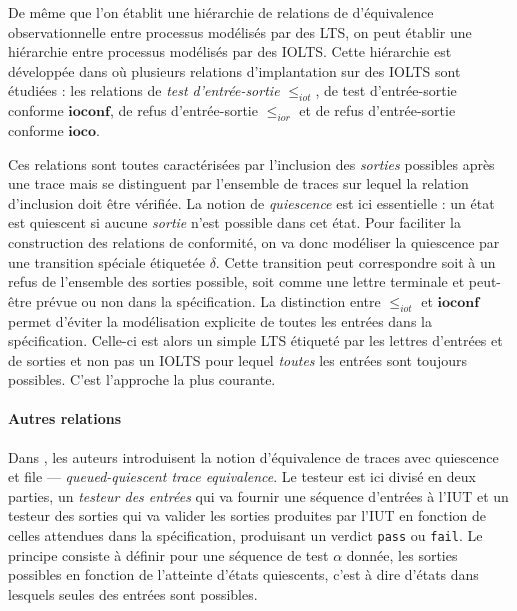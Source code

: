 De m\^eme que l'on \'etablit une hi\'erarchie de relations de
d'\'equivalence observationnelle entre processus mod\'elis\'es par
des \textsf{LTS}, on peut \'etablir une hi\'erarchie entre processus
mod\'elis\'es par des \textsf{IOLTS}. Cette hi\'erarchie est
d\'evelopp\'ee dans  \cite{tgenioq} o\`u plusieurs relations
d'implantation sur des \textsf{IOLTS} sont \'etudi\'ees :  les relations de \emph{test
  d'entr\'ee-sortie}  $\leq_{iot}$, de test d'entr\'ee-sortie
conforme $\mathbf{ioconf}$, de refus d'entr\'ee-sortie $\leq_{ior}$
et de refus d'entr\'ee-sortie conforme $\mathbf{ioco}$. 

Ces relations
sont toutes caract\'eris\'ees par l'inclusion des \emph{sorties}
possibles apr\`es une trace mais se distinguent par l'ensemble de
traces sur lequel la relation d'inclusion doit \^etre
v\'erifi\'ee. La notion de \emph{quiescence} est ici essentielle :
un \'etat est quiescent si aucune \emph{sortie} n'est possible dans
cet \'etat. Pour faciliter la construction des relations de
conformit\'e, on va donc mod\'eliser la quiescence par une
transition sp\'eciale \'etiquet\'ee $\delta$. Cette transition peut
correspondre soit \`a un refus de l'ensemble des sorties possible,
soit comme une lettre terminale et peut-\^etre pr\'evue ou non dans
la sp\'ecification.  La distinction
entre $\leq_{iot}$ et $\mathbf{ioconf}$ permet d'\'eviter la
mod\'elisation explicite de toutes les entr\'ees dans la
sp\'ecification. Celle-ci est alors un simple \textsf{LTS} \'etiquet\'e
par les lettres d'entr\'ees et de sorties et non pas un \textsf{IOLTS} pour
lequel \emph{toutes} les entr\'ees sont toujours possibles. C'est
l'approche la plus courante. 

\paragraph{Autres relations}

Dans \cite{petrenko-testlts-io}, les auteurs introduisent
la notion d'\'equivalence de traces avec quiescence et file ---
\emph{queued-quiescent trace equivalence}. Le testeur est ici divis\'e en deux parties, un \emph{testeur
des entr\'ees} qui va fournir une s\'equence d'entr\'ees \`a l'\textsf{IUT} et
un testeur des sorties qui va valider les sorties produites par
l'\textsf{IUT} en fonction de celles attendues dans la
sp\'ecification, 
produisant un verdict \texttt{pass} ou \texttt{fail}. Le principe 
consiste \`a d\'efinir pour une s\'equence de test $\alpha$ donn\'ee, les
sorties possibles en fonction de l'atteinte d'\'etats quiescents,
c'est \`a dire d'\'etats dans lesquels seules des entr\'ees sont
possibles.

